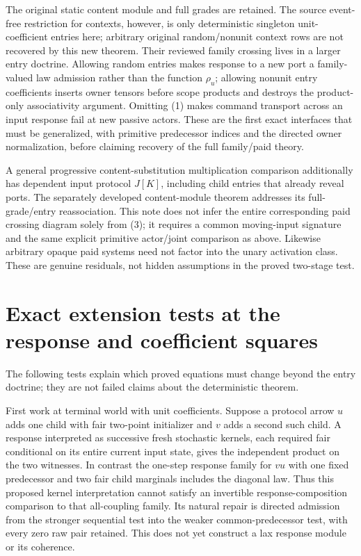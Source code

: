 \documentclass[11pt]{article}\usepackage{amsmath,amssymb,amsthm,geometry}\geometry{margin=1in}
\begin{document}
The original static content module and full grades are retained. The source event-free restriction for contexts, however, is only deterministic singleton unit-coefficient entries here; arbitrary original random/nonunit context rows are not recovered by this new theorem. Their reviewed family crossing lives in a larger entry doctrine. Allowing random entries makes response to a new port a family-valued law admission rather than the function $\rho_u$; allowing nonunit entry coefficients inserts owner tensors before scope products and destroys the product-only associativity argument. Omitting (1) makes command transport across an input response fail at new passive actors. These are the first exact interfaces that must be generalized, with primitive predecessor indices and the directed owner normalization, before claiming recovery of the full family/paid theory.

A general progressive content-substitution multiplication comparison additionally has dependent input protocol $J[K]$, including child entries that already reveal ports. The separately developed content-module theorem addresses its full-grade/entry reassociation. This note does not infer the entire corresponding paid crossing diagram solely from (3); it requires a common moving-input signature and the same explicit primitive actor/joint comparison as above. Likewise arbitrary opaque paid systems need not factor into the unary activation class. These are genuine residuals, not hidden assumptions in the proved two-stage test.

\section{Exact extension tests at the response and coefficient squares}
The following tests explain which proved equations must change beyond the entry doctrine; they are not failed claims about the deterministic theorem.

First work at terminal world with unit coefficients. Suppose a protocol arrow $u$ adds one child with fair two-point initializer and $v$ adds a second such child. A response interpreted as successive fresh stochastic kernels, each required fair conditional on its entire current input state, gives the independent product on the two witnesses. In contrast the one-step response family for $vu$ with one fixed predecessor and two fair child marginals includes the diagonal law. Thus this proposed kernel interpretation cannot satisfy an invertible response-composition comparison to that all-coupling family. Its natural repair is directed admission from the stronger sequential test into the weaker common-predecessor test, with every zero raw pair retained. This does not yet construct a lax response module or its coherence.
\end{document}
